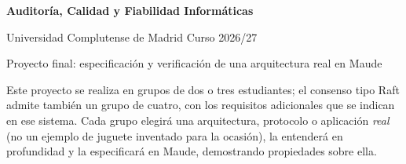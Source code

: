 

\usepackage{url}
\usepackage{hyperref}



\begin{center}
{\Large\textbf{Auditor\'ia, Calidad y Fiabilidad Inform\'aticas}}
\smallskip

\large
Universidad Complutense de Madrid \qquad Curso 2026/27
\medskip

Proyecto final: especificaci\'on y verificaci\'on de una arquitectura real en Maude\hfill\mbox{}

\noindent\hrulefill
\end{center}

\noindent
Este proyecto se realiza en grupos de dos o tres estudiantes; el consenso
tipo Raft admite también un grupo de cuatro, con los requisitos adicionales
que se indican en ese sistema.
%
Cada grupo elegir\'a una arquitectura, protocolo o
aplicaci\'on \emph{real} (no un ejemplo de juguete inventado para la ocasi\'on),
la entender\'a en profundidad y la especificar\'a en Maude, demostrando
propiedades sobre ella.


